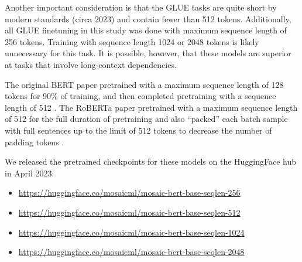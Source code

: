 Another important consideration is that the GLUE tasks are quite short by modern standards (circa 2023) and contain fewer than 512 tokens. Additionally, all GLUE finetuning in this study was done with maximum sequence length of 256 tokens. Training with sequence length 1024 or 2048 tokens is likely unnecessary for this task. It is possible, however, that these models are superior at tasks that involve long-context dependencies.

The original BERT paper pretrained with a maximum sequence length of 128 tokens for 90\% of training, and then completed pretraining with a sequence length of 512 \citep{devlin2018bert}. The RoBERTa paper pretrained with a maximum sequence length of 512 for the full duration of pretraining and also ``packed'' each batch sample with full sentences up to the limit of 512 tokens to decrease the number of padding tokens \citep{liu2019roberta}.

We released the pretrained checkpoints for these models on the HuggingFace hub in April 2023:
\begin{itemize}
    \item \href{https://huggingface.co/mosaicml/mosaic-bert-base-seqlen-256}{\url{https://huggingface.co/mosaicml/mosaic-bert-base-seqlen-256}}
    \item \href{https://huggingface.co/mosaicml/mosaic-bert-base-seqlen-512}{\url{https://huggingface.co/mosaicml/mosaic-bert-base-seqlen-512}}
    \item \href{https://huggingface.co/mosaicml/mosaic-bert-base-seqlen-1024}{\url{https://huggingface.co/mosaicml/mosaic-bert-base-seqlen-1024}}
    \item \href{https://huggingface.co/mosaicml/mosaic-bert-base-seqlen-2048}{\url{https://huggingface.co/mosaicml/mosaic-bert-base-seqlen-2048}}
\end{itemize}







